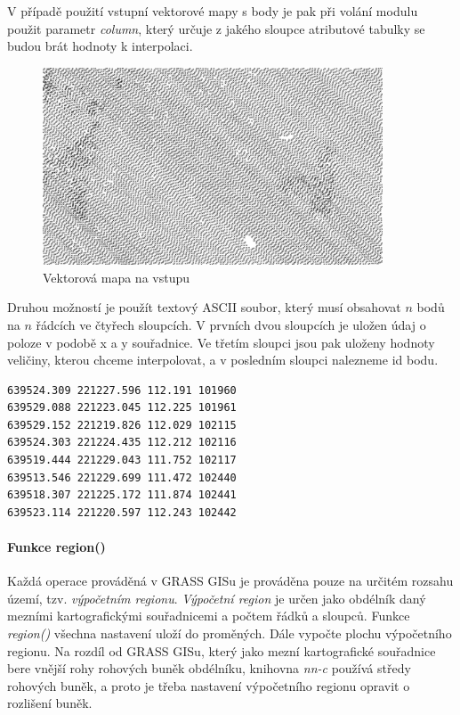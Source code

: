 \documentclass[12pt,a4paper]{article}
\begin{document}
V případě použití vstupní vektorové mapy s body je pak při volání modulu použit parametr \emph{column}, který určuje z jakého sloupce atributové tabulky se budou brát hodnoty k interpolaci.

\begin{figure}[h!]
\centering
\includegraphics[width=0.9\textwidth]{img/vstup_vect_map.png}
\caption{Vektorová mapa na vstupu}
\label{fig:vstup_vect_map}
\end{figure}

\newpage
Druhou možností je použít textový ASCII soubor, který musí obsahovat $n$ bodů na $n$ řádcích ve čtyřech sloupcích. V prvních dvou sloupcích je uložen údaj o poloze v podobě x a y souřadnice. Ve třetím sloupci jsou pak uloženy hodnoty veličiny, kterou chceme interpolovat, a v posledním sloupci nalezneme id bodu.

\begin{lstlisting}[caption={Příklad vstupního souboru}]
639524.309 221227.596 112.191 101960
639529.088 221223.045 112.225 101961
639529.152 221219.826 112.029 102115
639524.303 221224.435 112.212 102116
639519.444 221229.043 111.752 102117
639513.546 221229.699 111.472 102440
639518.307 221225.172 111.874 102441
639523.114 221220.597 112.243 102442
\end{lstlisting}

\bigskip
\paragraph{Funkce region()}
Každá operace prováděná v GRASS GISu je prováděna pouze na určitém rozsahu území, tzv. \emph{výpočetním regionu}. \emph{Výpočetní region} je určen jako obdélník daný mezními kartografickými souřadnicemi a počtem řádků a sloupců. 
Funkce \emph{region()} všechna nastavení uloží do proměných. Dále vypočte plochu výpočetního regionu. Na rozdíl od GRASS GISu, který jako mezní kartografické souřadnice bere vnější rohy rohových buněk obdélníku, knihovna \emph{nn-c} používá středy rohových buněk, a proto je třeba nastavení výpočetního regionu opravit o rozlišení buněk.
\end{document}
